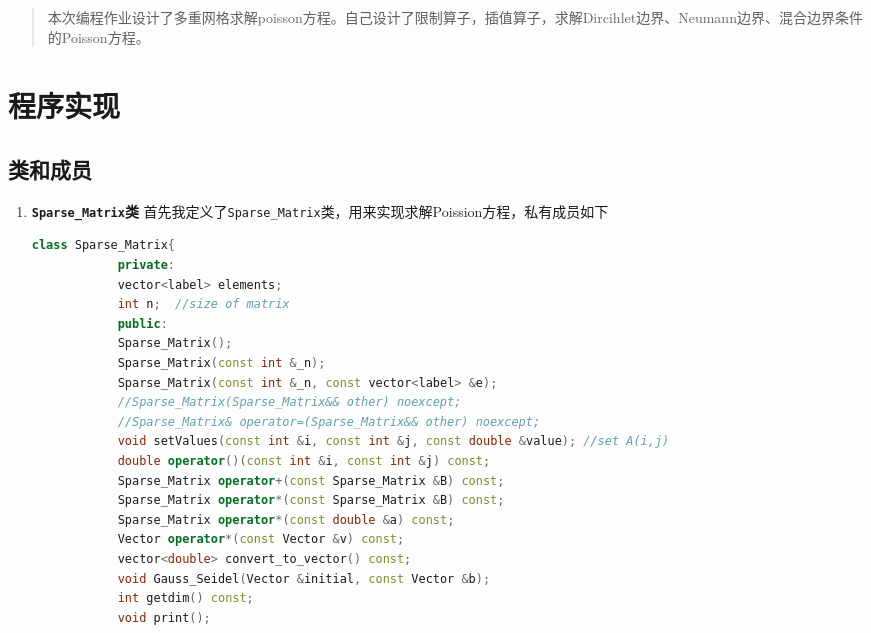 \documentclass[UTF8]{ctexart}
\begin{document}
	
	\pagestyle{fancy}
	\fancyhead{}
	\rhead{\today}
	\begin{abstract}
		本次编程作业设计了多重网格求解poisson方程。自己设计了限制算子，插值算子，求解Dircihlet边界、Neumann边界、混合边界条件的Poisson方程。
	\end{abstract}
	\section{程序实现}
	\subsection{类和成员}
	\begin{enumerate}
		\item  \textbf{\texttt{Sparse\_Matrix}类}	首先我定义了\texttt{Sparse\_Matrix}类，用来实现求解Poission方程，私有成员如下
		\begin{lstlisting}[language=C++, caption={运算符实现}, label={lst:operators}]
		class Sparse_Matrix{
			private: 
			vector<label> elements;
			int n;  //size of matrix
			public:
			Sparse_Matrix();
			Sparse_Matrix(const int &_n);
			Sparse_Matrix(const int &_n, const vector<label> &e);
			//Sparse_Matrix(Sparse_Matrix&& other) noexcept;
			//Sparse_Matrix& operator=(Sparse_Matrix&& other) noexcept;
			void setValues(const int &i, const int &j, const double &value); //set A(i,j)
			double operator()(const int &i, const int &j) const;
			Sparse_Matrix operator+(const Sparse_Matrix &B) const;
			Sparse_Matrix operator*(const Sparse_Matrix &B) const;
			Sparse_Matrix operator*(const double &a) const;
			Vector operator*(const Vector &v) const;
			vector<double> convert_to_vector() const;
			void Gauss_Seidel(Vector &initial, const Vector &b);
			int getdim() const;
			void print();
			

\end{lstlisting}
\end{enumerate}
\end{document}
